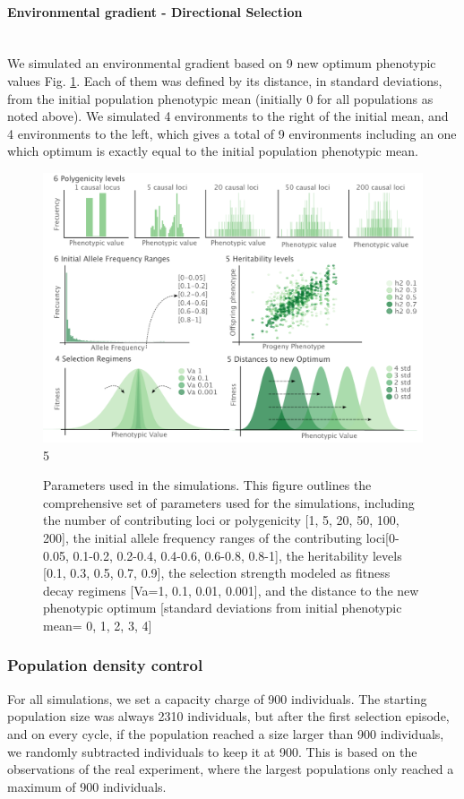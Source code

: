 \documentclass{article}
\let\oldparagraph\paragraph
\renewcommand{\paragraph}[1]{\oldparagraph{#1}\mbox{}\\}
\begin{document}
\paragraph{Environmental gradient - Directional Selection}
We simulated an environmental gradient based on 9 new optimum phenotypic values Fig. \ref{fig:parameters}. Each of them was defined by its distance, in standard deviations, from the initial population phenotypic mean (initially 0 for all populations as noted above). We simulated 4 environments to the right of the initial mean, and 4 environments to the left, which gives a total of 9 environments including an one which optimum is exactly equal to the initial population phenotypic mean. 

\begin{figure}[h]
    \centering
    \includegraphics[width=1\textwidth]{figures/parameters.pdf}
    5\captionsetup{font=small} 
    \caption{Parameters used in the simulations. This figure outlines the comprehensive set of parameters used for the simulations, including the number of contributing loci or polygenicity [1, 5, 20, 50, 100, 200], the initial allele frequency ranges of the contributing loci[0-0.05, 0.1-0.2, 0.2-0.4, 0.4-0.6, 0.6-0.8, 0.8-1], the heritability levels [0.1, 0.3, 0.5, 0.7, 0.9], the selection strength modeled as fitness decay regimens [Va=1, 0.1, 0.01, 0.001], and the distance to the new phenotypic optimum [standard deviations from initial phenotypic mean= 0, 1, 2, 3, 4]}
    \label{fig:parameters}
\end{figure}

\subsubsection{Population density control}
For all simulations, we set a capacity charge of 900 individuals. The starting population size was always 2310 individuals, but after the first selection episode, and on every cycle, if the population reached a size larger than 900 individuals, we randomly subtracted individuals to keep it at 900. This is based on the observations of the real experiment, where the largest populations only reached a maximum of 900 individuals. 
\end{document}
